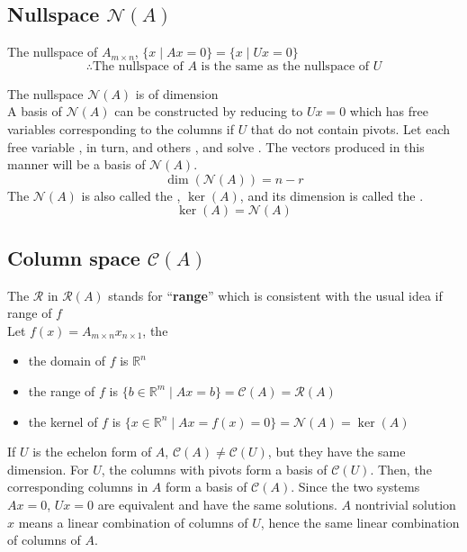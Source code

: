 
\subsection{Nullspace $\mathcal{N}(A)$}

The nullspace of $A_{m \times n}$, $\{x \mid Ax = 0\} = \{x \mid Ux = 0\}$ \\
\[
\therefore \text{The nullspace of $A$ is the same as the nullspace of $U$}
\]
\begin{proposition}[2N]
    The nullspace $\mathcal{N}(A)$ is of dimension  \\
    A basis of $\mathcal{N}(A)$ can be constructed by reducing to $Ux=0$ which has  free variables corresponding to the columns if $U$ that do not contain pivots. Let each free variable , in turn, and others , and solve . The  vectors produced in this manner will be a basis of $\mathcal{N}(A)$. \\
    \[
        \dim(\mathcal{N}(A)) = n - r
    \]
    The $\mathcal{N}(A)$ is also called the , $\ker(A)$, and its dimension is called the .
    \[
        \ker(A) = \mathcal{N}(A)
    \]
\end{proposition}

\subsection{Column space $\mathcal{C}(A)$}
The $\mathcal{R}$ in $\mathcal{R}(A)$ stands for ``\textbf{range}'' which is consistent with the usual idea if range of $f$ \\

Let $f(x) = A_{m\times n} x_{n\times 1}$, the
\begin{itemize}
    \item the domain of $f$ is $\mathbb{R}^n$
    \item the range of $f$ is $\{b \in \mathbb{R}^m \mid Ax=b\} = \mathcal{C}(A) = \mathcal{R}(A)$
    \item the kernel of $f$ is $\{x \in \mathbb{R}^n \mid Ax = f(x) = 0\} = \mathcal{N}(A) = \ker(A)$
\end{itemize}

If $U$ is the echelon form of $A$, $\mathcal{C}(A) \neq \mathcal{C}(U)$, but they have the same dimension. For $U$, the columns with pivots form a basis of $\mathcal{C}(U)$. Then, the corresponding columns in $A$ form a basis of $\mathcal{C}(A)$. Since the two systems $Ax=0$, $Ux=0$ are equivalent and have the same solutions. $A$ nontrivial solution $x$ means a linear combination of columns of $U$, hence the same linear combination of columns of $A$.

